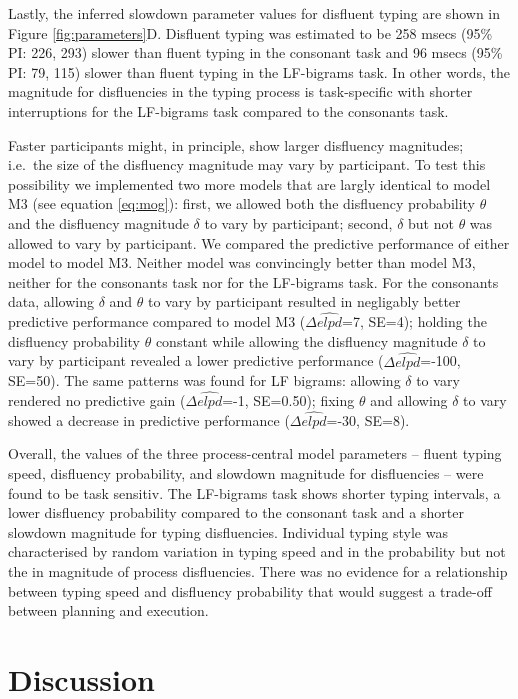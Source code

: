 \documentclass[
  english,
  man,mask,floatsintext]{apa7}
\begin{document}
Lastly, the inferred slowdown parameter values for disfluent typing are shown in Figure \ref{fig:parameters}D. Disfluent typing was estimated to be 258 msecs (95\% PI: 226, 293) slower than fluent typing in the consonant task and 96 msecs (95\% PI: 79, 115) slower than fluent typing in the LF-bigrams task. In other words, the magnitude for disfluencies in the typing process is task-specific with shorter interruptions for the LF-bigrams task compared to the consonants task.

Faster participants might, in principle, show larger disfluency magnitudes; i.e.~the size of the disfluency magnitude may vary by participant. To test this possibility we implemented two more models that are largly identical to model M3 (see equation \ref{eq:mog}): first, we allowed both the disfluency probability \(\theta\) and the disfluency magnitude \(\delta\) to vary by participant; second, \(\delta\) but not \(\theta\) was allowed to vary by participant. We compared the predictive performance of either model to model M3. Neither model was convincingly better than model M3, neither for the consonants task nor for the LF-bigrams task. For the consonants data, allowing \(\delta\) and \(\theta\) to vary by participant resulted in negligably better predictive performance compared to model M3 (\(\Delta\widehat{elpd}\)=7, SE=4); holding the disfluency probability \(\theta\) constant while allowing the disfluency magnitude \(\delta\) to vary by participant revealed a lower predictive performance (\(\Delta\widehat{elpd}\)=-100, SE=50). The same patterns was found for LF bigrams: allowing \(\delta\) to vary rendered no predictive gain (\(\Delta\widehat{elpd}\)=-1, SE=0.50); fixing \(\theta\) and allowing \(\delta\) to vary showed a decrease in predictive performance (\(\Delta\widehat{elpd}\)=-30, SE=8).

Overall, the values of the three process-central model parameters -- fluent typing speed, disfluency probability, and slowdown magnitude for disfluencies -- were found to be task sensitiv. The LF-bigrams task shows shorter typing intervals, a lower disfluency probability compared to the consonant task and a shorter slowdown magnitude for typing disfluencies. Individual typing style was characterised by random variation in typing speed and in the probability but not the in magnitude of process disfluencies. There was no evidence for a relationship between typing speed and disfluency probability that would suggest a trade-off between planning and execution.

\hypertarget{discussion}{%
\section{Discussion}\label{discussion}}
\end{document}
